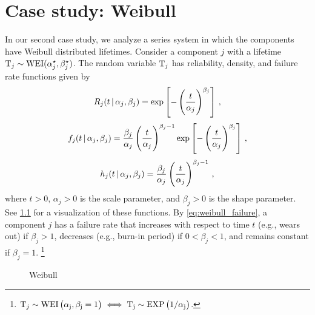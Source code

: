 \documentclass[../main.tex]{subfiles}
\begin{document}
\chapter{Case study: Weibull}
In our second case study, we analyze a series system in which the components have Weibull distributed lifetimes. Consider a component $j$ with a lifetime $\mathrm{T}_j \sim \text{WEI}({\alpha}^{\star}_j, {\beta}^{\star}_j)$.
The random variable $\mathrm{T}_j$ has reliability, density, and failure rate functions given by
\begin{equation}
\label{eq:weibull_reliability}
R_j(t {\,|\,} \alpha_j, \beta_j) =
    \exp \left[-\left( \frac{t}{\alpha_j}\right)^{\beta_j} \right]\,,
\end{equation}
\begin{equation}
\label{eq:weibull_pdf}
f_j(t {\,|\,} \alpha_j, \beta_j) =
    \frac{\beta_j}{\alpha_j}\left(\frac{t}{\alpha_j}\right)^{\beta_j-1} \exp \left [-\left(\frac{t}{\alpha_j}\right)^{\beta_j} \right ]\,,
\end{equation}
\begin{equation}
\label{eq:weibull_failure}
h_j(t {\,|\,} \alpha_j, \beta_j) =
    \frac{\beta_j}{\alpha_j}\left(\frac{t}{\alpha_j}\right)^{\beta_j-1}\,,
\end{equation}
where $t > 0$, $\alpha_j > 0$ is the scale parameter, and $\beta_j > 0$ is the shape parameter. See \cref{fig:weibull_series_functions} for a visualization of these functions.
By \cref{eq:weibull_failure}, a component $j$ has a failure rate that increases with respect to time $t$ (e.g., wears out) if $\beta_j > 1$, decreases (e.g., burn-in period) if $0 < \beta_j < 1$, and remains constant if $\beta_j = 1$.
\footnote{$\mathrm{T}_j \sim \rm{WEI}\left(\alpha_j, \beta_j = 1\right) \iff \mathrm{T}_j \sim \mathrm{EXP}\left(1/\alpha_j\right)$.}
\begin{figure}
    \caption{Weibull}
    \label{fig:weibull_series_functions}
    \centering
\end{figure}
\end{document}

